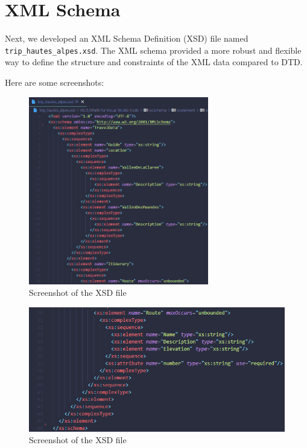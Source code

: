 \documentclass[12pt]{report}
\begin{document}
\section{XML Schema}

Next, we developed an XML Schema Definition (XSD) file named \texttt{trip\_hautes\_alpes.xsd}. 
The XML schema provided a more robust and flexible way to define the structure and constraints of the XML data compared to DTD.

\bigskip Here are some screenshots:

\begin{figure}[htbp]
	\centering
	\includegraphics[width=0.7\textwidth]{xsd.png}
	\caption{Screenshot of the XSD file}
	\label{fig:screenshot2}
  \end{figure}
  \begin{figure}[htbp]
	\centering
	\includegraphics[width=1.0\textwidth]{xsd2.png}
	\caption{Screenshot of the XSD file}
	\label{fig:screenshot3}
  \end{figure}
\end{document}
